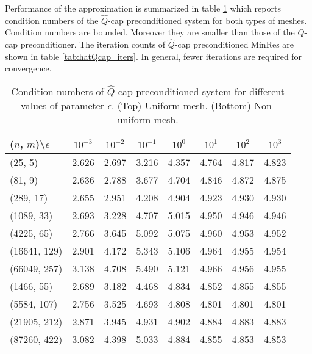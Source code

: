 \documentclass[10pt, a4paper]{article}
\begin{document}
Performance of the approximation is summarized in table \ref{tab:hatQcap} which
reports condition numbers of the $\hat{Q}$-cap preconditioned system for both
types of meshes. Condition numbers are bounded. Moreover they are smaller than
those of the $Q$-cap preconditioner. The iteration counts of $\hat{Q}$-cap
preconditioned MinRes are shown in table \ref{tab:hatQcap_iters}. In general, 
fewer iterations are required for convergence.
%
\begin{table}
  \caption{Condition numbers of $\hat{Q}$-cap preconditioned system for different 
  values of parameter $\epsilon$. (Top) Uniform mesh.
  (Bottom) Non-uniform mesh.
}
\label{tab:hatQcap}
\footnotesize{
\begin{tabular}{l|ccccccc}
\hline
($n$, $m$)\textbackslash $\epsilon$ & $10^{-3}$ & $10^{-2}$ & $10^{-1}$ & $10^{0}$ & $10^{1}$ & $10^{2}$ & $10^{3}$\\
\hline
(25, 5) & 2.626 & 2.697 & 3.216 & 4.357 & 4.764 & 4.817 & 4.823\\
(81, 9) & 2.636 & 2.788 & 3.677 & 4.704 & 4.846 & 4.872 & 4.875\\
(289, 17) & 2.655 & 2.951 & 4.208 & 4.904 & 4.923 & 4.930 & 4.930\\
(1089, 33) & 2.693 & 3.228 & 4.707 & 5.015 & 4.950 & 4.946 & 4.946\\
(4225, 65) & 2.766 & 3.645 & 5.092 & 5.075 & 4.960 & 4.953 & 4.952\\
(16641, 129) & 2.901 & 4.172 & 5.343 & 5.106 & 4.964 & 4.955 & 4.954\\
(66049, 257) & 3.138 & 4.708 & 5.490 & 5.121 & 4.966 & 4.956 & 4.955\\
\hline
\hline
(1466, 55) & 2.689 & 3.182 & 4.468 & 4.834 & 4.852 & 4.855 & 4.855\\
(5584, 107) & 2.756 & 3.525 & 4.693 & 4.808 & 4.801 & 4.801 & 4.801\\
(21905, 212) & 2.871 & 3.945 & 4.931 & 4.902 & 4.884 & 4.883 & 4.883\\
(87260, 422) & 3.082 & 4.398 & 5.033 & 4.884 & 4.855 & 4.853 & 4.853\\
\hline
\end{tabular}
}
\end{table}
\end{document}

